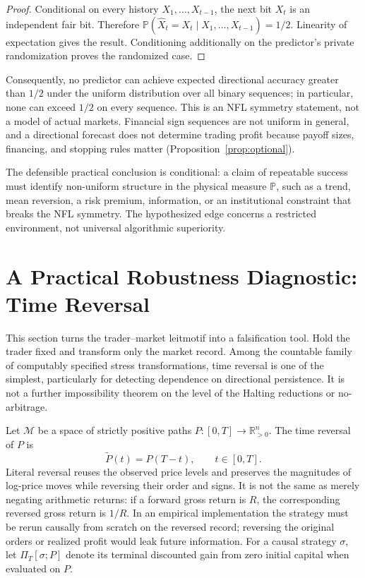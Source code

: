 \documentclass[aps,pra,reprint,superscriptaddress,amsmath,amssymb,floatfix]{revtex4-2}
\theoremstyle{plain}
\theoremstyle{definition}
\theoremstyle{remark}
\begin{document}
\begin{proof}
Conditional on every history \(X_1,\ldots,X_{t-1}\), the next bit \(X_t\) is
an independent fair bit. Therefore
\(\mathbb{P}(\widehat X_t=X_t\mid X_1,\ldots,X_{t-1})=1/2\).
Linearity of expectation gives the result. Conditioning additionally on the
predictor's private randomization proves the randomized case.
\end{proof}

Consequently, no predictor can achieve expected directional accuracy greater
than \(1/2\) under the uniform distribution over all binary sequences; in
particular, none can exceed \(1/2\) on every sequence. This is an NFL symmetry
statement, not a model of actual markets. Financial sign sequences are not
uniform in general, and a directional forecast does not determine trading
profit because payoff sizes, financing, and stopping rules matter
(Proposition~\ref{prop:optional}).

The defensible practical conclusion is conditional: a claim of repeatable
success must identify non-uniform structure in the physical measure
\(\mathbb{P}\), such as a trend, mean reversion, a risk premium, information,
or an institutional constraint that breaks the NFL symmetry. The hypothesized
edge concerns a restricted environment, not universal algorithmic
superiority.

\section{A Practical Robustness Diagnostic: Time Reversal}
\label{sec:criterion}

This section turns the trader--market leitmotif into a falsification tool. Hold
the trader fixed and transform only the market record. Among the countable
family of computably specified stress transformations, time reversal is one of
the simplest, particularly for detecting dependence on directional
persistence. It is not a further impossibility theorem on the level of the
Halting reductions or no-arbitrage.

Let \(\mathcal{M}\) be a space of strictly positive paths
\(P\colon[0,T]\to\mathbb{R}_{>0}^n\). The time reversal of \(P\) is
\begin{equation}
  \widetilde{P}(t)=P(T-t), \qquad t\in[0,T].
  \label{eq:timereversal}
\end{equation}
Literal reversal reuses the observed price levels and preserves the magnitudes
of log-price moves while reversing their order and signs. It is not the same
as merely negating arithmetic returns: if a forward gross return is \(R\), the
corresponding reversed gross return is \(1/R\). In an empirical implementation
the strategy must be rerun causally from scratch on the reversed record;
reversing the original orders or realized profit would leak future information.
For a causal strategy \(\sigma\), let \(\Pi_T[\sigma;P]\) denote its terminal
discounted gain from zero initial capital when evaluated on \(P\).
\end{document}
